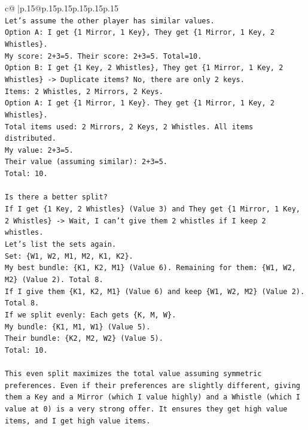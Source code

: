 \documentclass{article}
\begin{document}
{\begin{supertabular}{c@{$\;$}|p{.15\linewidth}@{}p{.15\linewidth}p{.15\linewidth}p{.15\linewidth}p{.15\linewidth}p{.15\linewidth}}
{{{\\ 
\texttt{Let's assume the other player has similar values.} \\
\texttt{Option A: I get \{1 Mirror, 1 Key\}, They get \{1 Mirror, 1 Key, 2 Whistles\}.} \\
\texttt{My score: 2+3=5. Their score: 2+3=5. Total=10.} \\
\texttt{Option B: I get \{1 Key, 2 Whistles\}, They get \{1 Mirror, 1 Key, 2 Whistles\} {-}> Duplicate items? No, there are only 2 keys.} \\
\texttt{Items: 2 Whistles, 2 Mirrors, 2 Keys.} \\
\texttt{Option A: I get \{1 Mirror, 1 Key\}. They get \{1 Mirror, 1 Key, 2 Whistles\}.} \\
\texttt{Total items used: 2 Mirrors, 2 Keys, 2 Whistles. All items distributed.} \\
\texttt{My value: 2+3=5.} \\
\texttt{Their value (assuming similar): 2+3=5.} \\
\texttt{Total: 10.} \\
\\ 
\texttt{Is there a better split?} \\
\texttt{If I get \{1 Key, 2 Whistles\} (Value 3) and They get \{1 Mirror, 1 Key, 2 Whistles\} {-}> Wait, I can't give them 2 whistles if I keep 2 whistles.} \\
\texttt{Let's list the sets again.} \\
\texttt{Set: \{W1, W2, M1, M2, K1, K2\}.} \\
\texttt{My best bundle: \{K1, K2, M1\} (Value 6). Remaining for them: \{W1, W2, M2\} (Value 2). Total 8.} \\
\texttt{If I give them \{K1, K2, M1\} (Value 6) and keep \{W1, W2, M2\} (Value 2). Total 8.} \\
\texttt{If we split evenly: Each gets \{K, M, W\}.} \\
\texttt{My bundle: \{K1, M1, W1\} (Value 5).} \\
\texttt{Their bundle: \{K2, M2, W2\} (Value 5).} \\
\texttt{Total: 10.} \\
\\ 
\texttt{This even split maximizes the total value assuming symmetric preferences. Even if their preferences are slightly different, giving them a Key and a Mirror (which I value highly) and a Whistle (which I value at 0) is a very strong offer. It ensures they get high value items, and I get high value items.} \\
}}}
\end{supertabular}}
\end{document}
